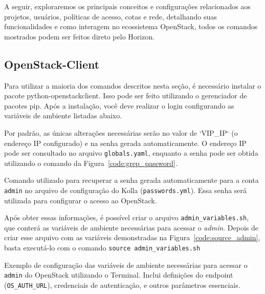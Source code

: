 A seguir, exploraremos os principais conceitos e configurações relacionados aos projetos, usuários, políticas de acesso, cotas e rede, detalhando suas funcionalidades e como interagem no ecossistema OpenStack, todos os comandos mostrados podem ser feitos direto pelo Horizon.

\subsection{OpenStack-Client}
Para utilizar a maioria dos comandos descritos nesta seção, é necessário instalar o pacote python-openstackclient. Isso pode ser feito utilizando o gerenciador de pacotes pip. Após a instalação, você deve realizar o login configurando as variáveis de ambiente listadas abaixo.

Por padrão, as únicas alterações necessárias serão no valor de `VIP\_IP` (o endereço IP configurado) e na senha gerada automaticamente. O endereço IP pode ser consultado no arquivo \texttt{globals.yaml}, enquanto a senha pode ser obtida utilizando o comando da Figura~\ref{code:grep_password}.

\begin{listing}[h!]
    \noindent{}  
  \caption{Comando utilizado para recuperar a senha gerada automaticamente para a conta \texttt{admin} no arquivo de configuração do Kolla (\texttt{passwords.yml}). Essa senha será utilizada para configurar o acesso ao OpenStack.}
  \label{code:grep_password}
\end{listing}

Após obter essas informações, é possível criar o arquivo \texttt{admin\_variables.sh}, que conterá as variáveis de ambiente necessárias para acessar o \textit{admin}. Depois de criar esse arquivo com as variáveis demonstradas na Figura~\ref{code:source_admin}, basta executá-lo com o comando \texttt{source admin\_variables.sh}

\begin{listing}[h!]
    \noindent{}  
  \caption{Exemplo de configuração das variáveis de ambiente necessárias para acessar o \texttt{admin} do OpenStack utilizando o Terminal. Inclui definições do endpoint (\texttt{OS\_AUTH\_URL}), credenciais de autenticação, e outros parâmetros essenciais.}
  \label{code:source_admin}
\end{listing}

